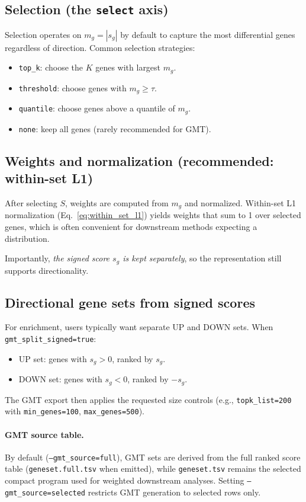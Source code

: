 \documentclass[11pt]{article}
\begin{document}
\subsection{Selection (the \texttt{select} axis)}
Selection operates on $m_g = |s_g|$ by default to capture the most differential genes regardless of direction.
Common selection strategies:
\begin{itemize}[leftmargin=2em]
\item \texttt{top\_k}: choose the $K$ genes with largest $m_g$.
\item \texttt{threshold}: choose genes with $m_g \ge \tau$.
\item \texttt{quantile}: choose genes above a quantile of $m_g$.
\item \texttt{none}: keep all genes (rarely recommended for GMT).
\end{itemize}

\subsection{Weights and normalization (recommended: within-set L1)}
After selecting $S$, weights are computed from $m_g$ and normalized.
Within-set L1 normalization (Eq.\ \ref{eq:within_set_l1}) yields weights that sum to 1 over selected genes, which is often convenient for downstream methods expecting a distribution.

Importantly, \emph{the signed score $s_g$ is kept separately}, so the representation still supports directionality.

\subsection{Directional gene sets from signed scores}
For enrichment, users typically want separate UP and DOWN sets.
When \texttt{gmt\_split\_signed=true}:
\begin{itemize}[leftmargin=2em]
\item UP set: genes with $s_g > 0$, ranked by $s_g$.
\item DOWN set: genes with $s_g < 0$, ranked by $-s_g$.
\end{itemize}
The GMT export then applies the requested size controls (e.g., \texttt{topk\_list=200} with \texttt{min\_genes=100}, \texttt{max\_genes=500}).

\paragraph{GMT source table.}
By default (\texttt{--gmt\_source=full}), GMT sets are derived from the full ranked score table (\texttt{geneset.full.tsv} when emitted), while \texttt{geneset.tsv} remains the selected compact program used for weighted downstream analyses.
Setting \texttt{--gmt\_source=selected} restricts GMT generation to selected rows only.
\end{document}
